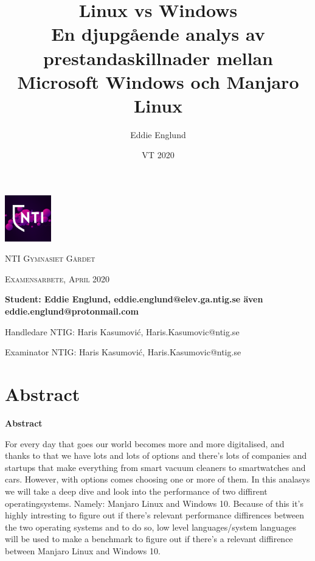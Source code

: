 \documentclass[12pt, a4paper]{report}
\author{Eddie Englund}
\title{Linux vs Windows\\[0.2em]\smaller{}En djupgående analys av prestandaskillnader mellan Microsoft Windows och Manjaro Linux}
\date{VT 2020}
\makeatletter
\renewcommand*{\abstractname}{Abstract}
\renewenvironment{abstract}{%
    \if@twocolumn
    \renewcommand*{\abstractname}{Abstract}

      \section*{\abstractname}%
    \else %
      \begin{flushleft}%
        \renewcommand*{\abstractname}{Abstract}

        {\bfseries \Large\abstractname\vspace{\z@}}%
      \end{flushleft}%
      \quotation
    \fi}
    {\if@twocolumn\else\endquotation\fi}
\makeatother
\begin{document}
\begin{titlepage}
    \maketitle

    \begin{center}
        \thispagestyle{empty}
    
        \includegraphics[width=0.15\textwidth]{nti.png}\par\vspace{1cm}

    {\scshape\LARGE NTI Gymnasiet Gärdet \par}
    \vspace{1cm}
    {\scshape\Large Examensarbete, April 2020\par}
	\vspace{1.5cm}
    \textbf{
    Student: Eddie Englund, eddie.englund@elev.ga.ntig.se även eddie.englund@protonmail.com}
    \vspace{0.2cm}

    Handledare NTIG: Haris Kasumović, Haris.Kasumovic@ntig.se
    \vspace{0.1cm}

    Examinator NTIG: Haris Kasumović, Haris.Kasumovic@ntig.se
    
    \end{center}
\end{titlepage}

\setlength{\cftbeforetoctitleskip}{-3em}
\tableofcontents

\vspace{2cm}
\begin{abstract}
For every day that goes our world becomes more and more digitalised, and thanks to that we have lots and lots of options and there's lots of companies and startups that make everything from smart vacuum cleaners to smartwatches and cars. However, with options comes choosing one or more of them. In this analasys we will take a deep dive and look into the performance of two diffirent operatingsystems. Namely: Manjaro Linux and Windows 10. Because of this it's highly intresting to figure out if there's relevant performance diffirences between the two operating systems and to do so, low level languages/system languages will be used to make a benchmark to figure out if there's a relevant diffirence between Manjaro Linux and Windows 10.

\end{abstract}
\end{document}
